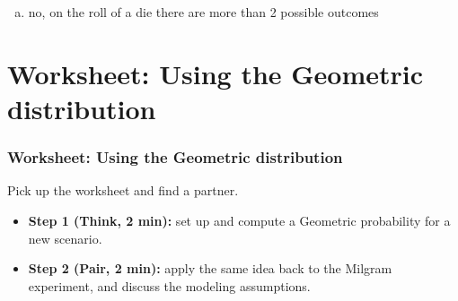 \documentclass[slidestop,compress,mathserif]{beamer}
\newcommand{\soln}[1]{\textit{#1}}
\begin{document}



\begin{frame}


\begin{enumerate}[(a)]
\item no, on the roll of a die there are more than 2 possible outcomes
\soln{}
\end{enumerate}

\soln{
\only<2>{
\[P(6~on~the~6^{th}~roll) = \pr{ \frac{5}{6} }^5 \pr{ \frac{1}{6} } \approx 0.067 \]
}
}

\end{frame}



\section{Worksheet: Using the Geometric distribution}

\begin{frame}
\frametitle{Worksheet: Using the Geometric distribution}

Pick up the worksheet and find a partner.

\begin{itemize}
    \item \textbf{Step 1 (Think, 2 min):} set up and compute a Geometric probability for a new scenario.
    \item \textbf{Step 2 (Pair, 2 min):} apply the same idea back to the Milgram experiment, and discuss the modeling assumptions.
\end{itemize}

\end{frame}



\end{document}
